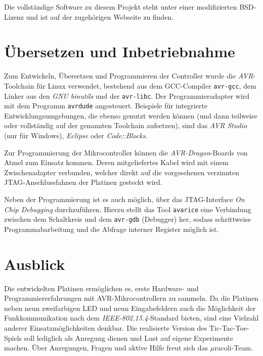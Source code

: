 \documentclass{clt2012}
\begin{document}
Die vollständige Software zu diesem Projekt steht unter einer modifizierten BSD-Lizenz
und ist auf der zugehörigen Webseite \cite{uracoli} zu finden.

\section{Übersetzen und Inbetriebnahme}

Zum Entwickeln, Übersetzen und Programmieren der Controller wurde die 
\emph{AVR}-Toolchain für Linux verwendet, bestehend aus dem GCC-Compiler \texttt{avr-gcc}, dem Linker aus den
\emph{GNU binutils} und der \texttt{avr-libc}. Der Programmieradapter wird mit dem Programm \texttt{avrdude} angesteuert.
Beispiele für integrierte Entwicklungsumgebungen, die ebenso genutzt werden können (und dann teilweise oder vollständig auf der genannten Toolchain aufsetzen), sind das
\emph{AVR Studio} \cite{avrstudio} (nur für Windows), \emph{Eclipse} oder \emph{Code::Blocks}.

Zur Programmierung der Mikrocontroller können die \emph{AVR-Dragon}-Boards von Atmel zum Einsatz kommen.
Deren mitgeliefertes Kabel wird mit einem Zwischenadapter verbunden, welcher direkt auf die vorgesehenen
verzinnten JTAG-Anschluss\-fahnen der Platinen gesteckt wird.

Neben der Programmierung ist es auch möglich, über das JTAG-Interface \emph{On Chip Debugging}
durchzuführen. Hierzu stellt das Tool \texttt{avarice} eine Verbindung zwischen dem Schaltkreis und
dem \texttt{avr-gdb} (Debugger) her, sodass schrittweise Prog\-ramm\-ab\-ar\-beitung und die Abfrage interner
Register möglich ist. 

\section{Ausblick}

Die entwickelten Platinen ermöglichen es, erste Hardware- und Programmiererfahrungen mit
AVR-Mikrocontrollern zu sammeln.
Da die Platinen neben neun zweifarbigen LED und neun Eingabefeldern auch die Möglichkeit der
Funkkommunikation nach dem \emph{IEEE-802.15.4}-Standard bieten, sind eine Vielzahl anderer
Einsatzmöglichkeiten denkbar. Die realisierte Version des Tic-Tac-Toe-Spiels soll lediglich als Anregung dienen und Lust auf eigene Experimente machen.
Über Anregungen, Fragen und aktive Hilfe freut sich das $\mu{}$racoli-Team.
\end{document}
